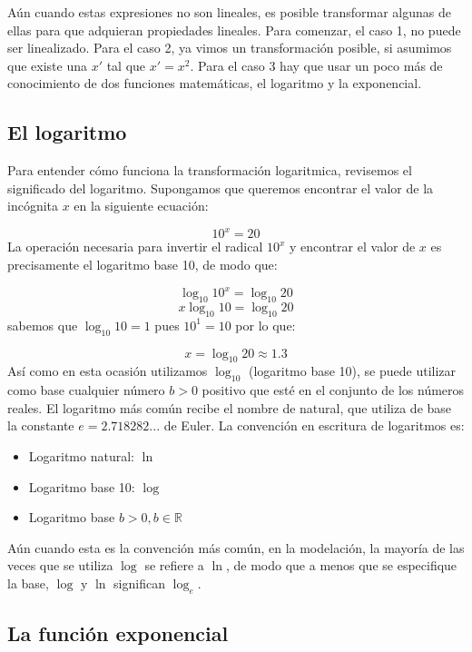 \documentclass[
]{book}
\providecommand{\tightlist}{%
  \setlength{\itemsep}{0pt}\setlength{\parskip}{0pt}}
\begin{document}
Aún cuando estas expresiones no son lineales, es posible transformar algunas de ellas para que adquieran propiedades lineales. Para comenzar, el caso 1, no puede ser linealizado. Para el caso 2, ya vimos un transformación posible, si asumimos que existe una \(x'\) tal que \(x' = x^2\). Para el caso 3 hay que usar un poco más de conocimiento de dos funciones matemáticas, el logaritmo y la exponencial.

\hypertarget{el-logaritmo}{%
\subsection{El logaritmo}\label{el-logaritmo}}

Para entender cómo funciona la transformación logaritmica, revisemos el significado del logaritmo. Supongamos que queremos encontrar el valor de la incógnita \(x\) en la siguiente ecuación:

\[10^x = 20\]
La operación necesaria para invertir el radical \(10^x\) y encontrar el valor de \(x\) es precisamente el logaritmo base 10, de modo que:

\[\log_{10} 10^x = \log_{10} 20\]
\[x \log_{10} 10 = \log_{10} 20\]
sabemos que \(\log_{10} 10 = 1\) pues \(10^1 = 10\) por lo que:

\[x = \log_{10} 20 \approx 1.3\]
Así como en esta ocasión utilizamos \(\log_{10}\) (logaritmo base 10), se puede utilizar como base cualquier número \(b > 0\) positivo que esté en el conjunto de los números reales. El logaritmo más común recibe el nombre de natural, que utiliza de base la constante \(e = 2.718282 ...\) de Euler. La convención en escritura de logaritmos es:

\begin{itemize}
\tightlist
\item
  Logaritmo natural: \(\ln\)
\item
  Logaritmo base 10: \(\log\)
\item
  Logaritmo base \(b > 0, b \in \mathbb{R}\)
\end{itemize}

Aún cuando esta es la convención más común, en la modelación, la mayoría de las veces que se utiliza \(\log\) se refiere a \(\ln\), de modo que a menos que se especifique la base, \(\log\) y \(\ln\) significan \(\log_e\).

\hypertarget{la-funciuxf3n-exponencial}{%
\subsection{La función exponencial}\label{la-funciuxf3n-exponencial}}
\end{document}
